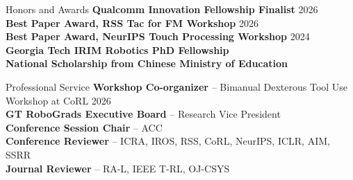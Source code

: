 \documentclass{resume} %
\begin{document}
\begin{rSection}{Honors and Awards}
\textbf{Qualcomm Innovation Fellowship Finalist} \hfill 2026 \\
\textbf{Best Paper Award, RSS Tac for FM Workshop} \hfill 2026 \\
\textbf{Best Paper Award, NeurIPS Touch Processing Workshop} \hfill 2024 \\
\textbf{Georgia Tech IRIM Robotics PhD Fellowship}  \\
\textbf{National Scholarship from Chinese Ministry of Education} 
\end{rSection}
\begin{rSection}{Professional Service}
\textbf{Workshop Co-organizer} -- Bimanual Dexterous Tool Use Workshop at CoRL 2026 \\
\textbf{GT RoboGrads Executive Board} -- Research Vice President \\
\textbf{Conference Session Chair} -- ACC \\
\textbf{Conference Reviewer} -- ICRA, IROS, RSS, CoRL, NeurIPS, ICLR, AIM, SSRR \\
\textbf{Journal Reviewer} -- RA-L, IEEE T-RL, OJ-CSYS \\
\end{rSection}
\end{document}
